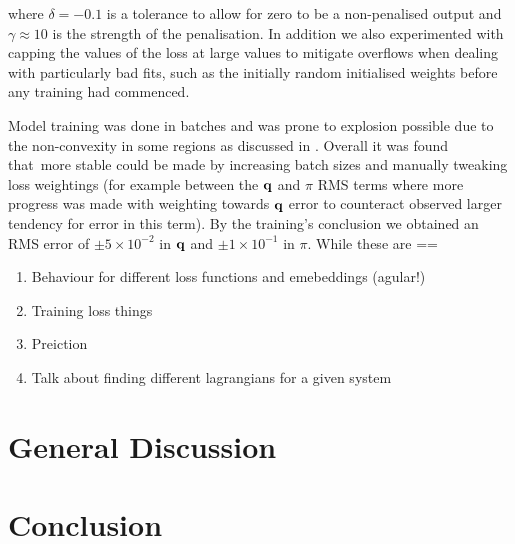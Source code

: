 where $\delta = −0.1$ is a tolerance to allow for zero to be a non-penalised output and $\gamma \approx 10$ is the strength of the penalisation. In addition we also experimented with capping the values of the loss at large values to mitigate overflows when dealing with particularly bad fits, such as the initially random initialised weights before any training had commenced.

Model training was done in batches and was prone to explosion possible due to the non-convexity in some regions as discussed in . Overall it was found that more stable could be made by increasing batch sizes and manually tweaking loss weightings (for example between the $\vb q$ and $\pi$ RMS terms where more progress was made with weighting towards $\vb{q}$ error to counteract observed larger tendency for error in this term). By the training's conclusion we obtained an RMS error of $\pm 5 \times 10^{-2}$ in $\vb{q}$ and $\pm 1 \times 10 ^{-1}$ in $\pi$. While these are ==



\begin{enumerate}
	\item Behaviour for different loss functions and emebeddings (agular!)
	\item Training loss things
	\item Preiction
	\item Talk about finding different lagrangians for a given system
\end{enumerate}



\section{General Discussion}




\section{Conclusion}

